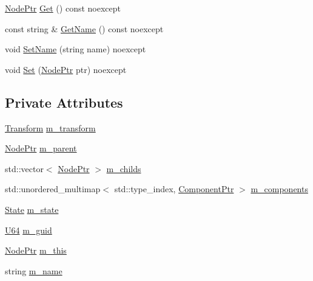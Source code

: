 \begin{DoxyCompactItemize}
\item 
\mbox{\hyperlink{classmage_1_1_node_ac575dc006e0ae1134277ade977dc06b6}{Node\+Ptr}} \mbox{\hyperlink{classmage_1_1_node_ac317011c240a845fbdb7209e26d560f2}{Get}} () const noexcept
\item 
const string \& \mbox{\hyperlink{classmage_1_1_node_a206e7c7ef80a0561b31ebbb9d05c98a0}{Get\+Name}} () const noexcept
\item 
void \mbox{\hyperlink{classmage_1_1_node_a78e4ef8457d200662d2f4881cef08688}{Set\+Name}} (string name) noexcept
\item 
void \mbox{\hyperlink{classmage_1_1_node_aabbe500cdf7842b663bfcf034de25c5a}{Set}} (\mbox{\hyperlink{classmage_1_1_node_ac575dc006e0ae1134277ade977dc06b6}{Node\+Ptr}} ptr) noexcept
\end{DoxyCompactItemize}
\subsection*{Private Attributes}
\begin{DoxyCompactItemize}
\item 
\mbox{\hyperlink{classmage_1_1_transform}{Transform}} \mbox{\hyperlink{classmage_1_1_node_a0f4dd0c46d9713fd64b0e562862afac6}{m\+\_\+transform}}
\item 
\mbox{\hyperlink{classmage_1_1_node_ac575dc006e0ae1134277ade977dc06b6}{Node\+Ptr}} \mbox{\hyperlink{classmage_1_1_node_aa04f166b52fca444c8756c0864a16cde}{m\+\_\+parent}}
\item 
std\+::vector$<$ \mbox{\hyperlink{classmage_1_1_node_ac575dc006e0ae1134277ade977dc06b6}{Node\+Ptr}} $>$ \mbox{\hyperlink{classmage_1_1_node_a1d1d432f46c61932b5167d27d20cc383}{m\+\_\+childs}}
\item 
std\+::unordered\+\_\+multimap$<$ std\+::type\+\_\+index, \mbox{\hyperlink{classmage_1_1_node_a46b7e1f4f5b98bfa78ed96a80797a4ba}{Component\+Ptr}} $>$ \mbox{\hyperlink{classmage_1_1_node_a804d53398f193b6b06f883131ab7415d}{m\+\_\+components}}
\item 
\mbox{\hyperlink{namespacemage_ae47d13d8477ee94893b9a3947d28eebc}{State}} \mbox{\hyperlink{classmage_1_1_node_a76b775e32bb001c54a9927461eaf7926}{m\+\_\+state}}
\item 
\mbox{\hyperlink{namespacemage_a6672cf3c861707ce4a3235a3eb43941d}{U64}} \mbox{\hyperlink{classmage_1_1_node_a3ef1876293074bfcc01104eb92f1bfdf}{m\+\_\+guid}}
\item 
\mbox{\hyperlink{classmage_1_1_node_ac575dc006e0ae1134277ade977dc06b6}{Node\+Ptr}} \mbox{\hyperlink{classmage_1_1_node_ab056e1563dca22433efa152f4b6da46f}{m\+\_\+this}}
\item 
string \mbox{\hyperlink{classmage_1_1_node_a476cc21fa65cdf9bde0f11fe08b5a707}{m\+\_\+name}}
\end{DoxyCompactItemize}



